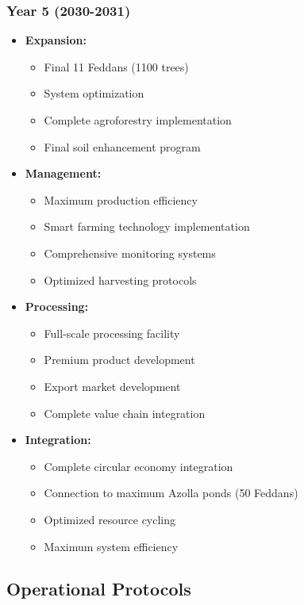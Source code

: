 \subsubsection{Year 5 (2030-2031)}
\begin{itemize}
    \item \textbf{Expansion:}
    \begin{itemize}
        \item Final 11 Feddans (1100 trees)
        \item System optimization
        \item Complete agroforestry implementation
        \item Final soil enhancement program
    \end{itemize}
    \item \textbf{Management:}
    \begin{itemize}
        \item Maximum production efficiency
        \item Smart farming technology implementation
        \item Comprehensive monitoring systems
        \item Optimized harvesting protocols
    \end{itemize}
    \item \textbf{Processing:}
    \begin{itemize}
        \item Full-scale processing facility
        \item Premium product development
        \item Export market development
        \item Complete value chain integration
    \end{itemize}
    \item \textbf{Integration:}
    \begin{itemize}
        \item Complete circular economy integration
        \item Connection to maximum Azolla ponds (50 Feddans)
        \item Optimized resource cycling
        \item Maximum system efficiency
    \end{itemize}
\end{itemize}

\subsection{Operational Protocols}

